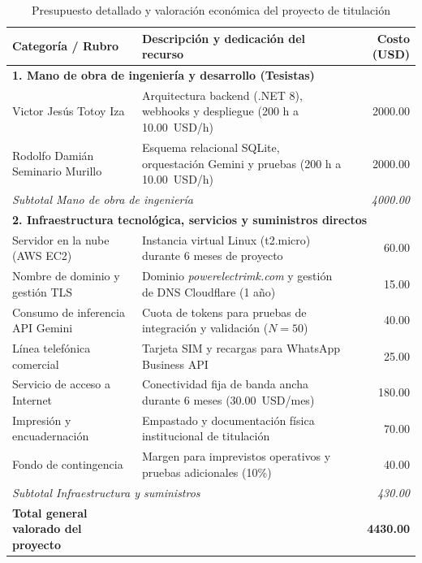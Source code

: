 \begin{table}[H]
\centering
\caption{Presupuesto detallado y valoración económica del proyecto de titulación}
\label{tab:presupuesto}
\begin{tabular}{p{5.2cm} p{6.8cm} r}
\toprule
\textbf{Categoría / Rubro} & \textbf{Descripción y dedicación del recurso} & \textbf{Costo (USD)} \\
\midrule
\multicolumn{3}{l}{\textbf{1. Mano de obra de ingeniería y desarrollo (Tesistas)}} \\
Victor Jesús Totoy Iza & Arquitectura backend (.NET 8), webhooks y despliegue (200 h a 10.00~USD/h) & 2000.00 \\
Rodolfo Damián Seminario Murillo & Esquema relacional SQLite, orquestación Gemini y pruebas (200 h a 10.00~USD/h) & 2000.00 \\
\midrule
\multicolumn{2}{l}{\textit{Subtotal Mano de obra de ingeniería}} & \textit{4000.00} \\
\midrule
\multicolumn{3}{l}{\textbf{2. Infraestructura tecnológica, servicios y suministros directos}} \\
Servidor en la nube (AWS EC2) & Instancia virtual Linux (t2.micro) durante 6 meses de proyecto & 60.00 \\
Nombre de dominio y gestión TLS & Dominio \textit{powerelectrimk.com} y gestión de DNS Cloudflare (1 año) & 15.00 \\
Consumo de inferencia API Gemini & Cuota de tokens para pruebas de integración y validación ($N=50$) & 40.00 \\
Línea telefónica comercial & Tarjeta SIM y recargas para WhatsApp Business API & 25.00 \\
Servicio de acceso a Internet & Conectividad fija de banda ancha durante 6 meses (30.00~USD/mes) & 180.00 \\
Impresión y encuadernación & Empastado y documentación física institucional de titulación & 70.00 \\
Fondo de contingencia & Margen para imprevistos operativos y pruebas adicionales (10\%) & 40.00 \\
\midrule
\multicolumn{2}{l}{\textit{Subtotal Infraestructura y suministros}} & \textit{430.00} \\
\midrule
\textbf{Total general valorado del proyecto} & & \textbf{4430.00} \\
\bottomrule
\end{tabular}
\end{table}

